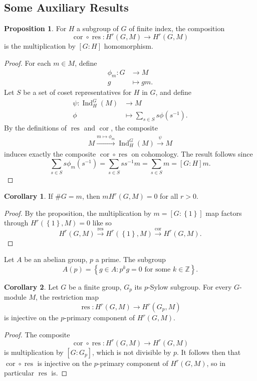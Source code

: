 \documentclass[class=article, crop=false]{standalone}
\newcommand{\ZZ}{\mathbb{Z}}
\newcommand{\Ind}{\operatorname{Ind}}
\newcommand{\res}{\operatorname{res}}
\newcommand{\cor}{\operatorname{cor}}
\theoremstyle{definition}
\newtheorem{proposition}{Proposition}[section]
\newtheorem{corollary}{Corollary}[section]
\begin{document}
\subsection{Some Auxiliary Results}
\begin{proposition}
	For $H$ a subgroup of $G$ of finite index, the composition
	\[
		\cor\circ\res:H^{r}(G,M)\to H^{r}(G,M)
	\] 
	is the multiplication by $[G:H]$ homomorphism.
\end{proposition}
\begin{proof}
	For each $m\in M$, define
	\begin{align*}
		\phi_m:G&\to M\\
		g&\mapsto gm
	.\end{align*}
	Let $S$ be a set of coset representatives for $H$ in $G$, and define
	\begin{align*}
		\psi:\Ind^{G}_H(M)&\to M\\
		\phi&\mapsto\sum\limits_{s\in S}s\phi(s^{-1})
	.\end{align*}
	By the definitions of $\res$ and $\cor$, the composite
	\begin{align*}
		M\xrightarrow{m\mapsto\phi_m}\Ind^{G}_H(M)\xrightarrow{\psi}M
	\end{align*}
	induces exactly the composite $\cor\circ\res$ on cohomology. The result follows since
	\[
		\sum\limits_{s\in S}s\phi_m(s^{-1})=\sum\limits_{s\in S}ss^{-1}m=\sum\limits_{s\in S}m=[G:H]m
	.\] 
\end{proof}
\begin{corollary}\label{cor:mult-triv}
	If $\#G=m$, then $mH^{r}(G,M)=0$ for all $r>0$.
\end{corollary}
\begin{proof}
	By the proposition, the multiplication by $m=[G:\left\lbrace 1\right\rbrace]$ map factors through $H^{r}(\left\lbrace 1\right\rbrace,M)=0$ like so
	\[
		H^{r}(G,M)\xrightarrow{\res}H^{r}(\left\lbrace 1\right\rbrace,M)\xrightarrow{\cor} H^{r}(G,M)
	.\] 
\end{proof}
Let $A$ be an abelian group, $p$ a prime. The subgroup
\[
	A(p)=\left\lbrace g\in A:p^{k}g=0 \text{ for some }k\in\ZZ\right\rbrace
.\] 
\begin{corollary}
	Let $G$ be a finite group, $G_p$ its $p$-Sylow subgroup. For every $G$-module $M$, the restriction map
	\[
		\res:H^{r}(G,M)\to H^{r}(G_p,M)
	\] 
	is injective on the $p$-primary component of $H^{r}(G,M)$.
\end{corollary}
\begin{proof}
	The composite
	\[
		\cor\circ\res:H^{r}(G,M)\to H^{r}(G,M)
	\] 
	is multiplication by $[G:G_p]$, which is not divisible by $p$. It follows then that $\cor\circ\res$ is injective on the $p$-primary component of $H^{r}(G,M)$, so in particular $\res$ is.
\end{proof}
\end{document}
